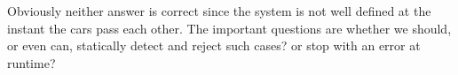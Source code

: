 \documentclass[a4paper]{article}
\begin{document}
Obviously neither answer is correct since the system is not well defined at 
the instant the cars pass each other.
The important questions are whether we should, or even can, statically 
detect and reject such cases? or stop with an error at runtime?



\end{document}
